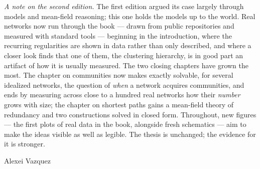 \documentclass[10pt]{book}
\begin{document}
\emph{A note on the second edition.} The first edition argued its case largely
through models and mean-field reasoning; this one holds the models up to the
world. Real networks now run through the book --- drawn from public repositories
and measured with standard tools --- beginning in the introduction, where the
recurring regularities are shown in data rather than only described, and where a
closer look finds that one of them, the clustering hierarchy, is in good part an
artifact of how it is usually measured. The two closing chapters have grown the
most. The chapter on communities now makes exactly solvable, for several
idealized networks, the question of \emph{when} a network acquires communities,
and ends by measuring across close to a hundred real networks how their
\emph{number} grows with size; the chapter on shortest paths gains a mean-field
theory of redundancy and two constructions solved in closed form. Throughout, new
figures --- the first plots of real data in the book, alongside fresh schematics
--- aim to make the ideas visible as well as legible. The thesis is unchanged; the
evidence for it is stronger.

\vspace{1em}
\noindent Alexei Vazquez

\tableofcontents




























\end{document}
